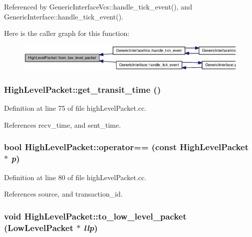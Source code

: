 Referenced by GenericInterfaceVcs::handle\_\-tick\_\-event(), and GenericInterface::handle\_\-tick\_\-event().

Here is the caller graph for this function:\nopagebreak
\begin{figure}[H]
\begin{center}
\leavevmode
\includegraphics[width=420pt]{classHighLevelPacket_6a4e25020ea0c66aab015e9c2a2c8c85_icgraph}
\end{center}
\end{figure}
\subsubsection[{get\_\-transit\_\-time}]{ HighLevelPacket::get\_\-transit\_\-time ()}\label{classHighLevelPacket_0ddd2a5fd2195c2ce43198c82163522c}




Definition at line 75 of file highLevelPacket.cc.

References recv\_\-time, and sent\_\-time.
\subsubsection[{operator==}]{\setlength{\rightskip}{0pt plus 5cm}bool HighLevelPacket::operator== (const {\bf HighLevelPacket} $\ast$ {\em p})}\label{classHighLevelPacket_08e3560b71bab8b1ff31844d8ddff819}




Definition at line 80 of file highLevelPacket.cc.

References source, and transaction\_\-id.
\subsubsection[{to\_\-low\_\-level\_\-packet}]{\setlength{\rightskip}{0pt plus 5cm}void HighLevelPacket::to\_\-low\_\-level\_\-packet ({\bf LowLevelPacket} $\ast$ {\em llp})}\label{classHighLevelPacket_03017f87443d346d08e8ebb4281073c1}




